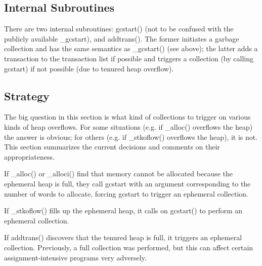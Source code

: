 \subsection{Internal Subroutines}

There are two internal subroutines: gcstart() (not to be confused with
the publicly available \_gcstart), and addtrans(). The former initiates a
garbage collection and has the same semantics as \_gcstart() (see above);
the latter adds a transaction to the transaction list if possible and
triggers a collection (by calling gcstart) if not possible (due to tenured
heap overflow).


\subsection{Strategy}

The big question in this section is what kind of collections to
trigger on various kinds of heap overflows. For some situations (e.g.
if \_alloc() overflows the heap) the answer is obvious; for others (e.g.
if \_stkoflow() overflows the heap), it is not. This section summarizes
the current decisions and comments on their appropriateness.

If \_alloc() or \_alloci() find that memory cannot be allocated because the
ephemeral heap is full, they call gcstart with an argument corresponding
to the number of words to allocate, forcing gcstart to trigger an
ephemeral collection.

If \_stkoflow() fills up the ephemeral heap, it calls on gcstart() to
perform an ephemeral collection.

If addtrans() discovers that the tenured heap is full, it triggers an
ephemeral collection. Previously, a full collection was performed, but this
can affect certain assignment-intensive programs very adversely.


